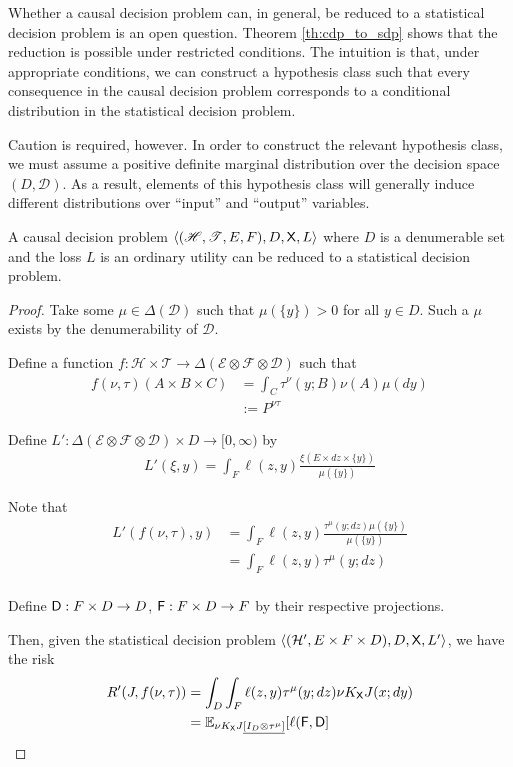 Whether a causal decision problem can, in general, be reduced to a statistical decision problem is an open question. Theorem \ref{th:cdp_to_sdp} shows that the reduction is possible under restricted conditions. The intuition is that, under appropriate conditions, we can construct a hypothesis class such that every consequence in the causal decision problem corresponds to a conditional distribution in the statistical decision problem.

Caution is required, however. In order to construct the relevant hypothesis class, we must assume a positive definite marginal distribution over the decision space $(D,\mathcal{D})$. As a result, elements of this hypothesis class will generally induce different distributions over ``input'' and ``output'' variables.

\begin{theorem}\label{th:cdp_to_sdp}
A causal decision problem $\langle (\mathscr{H},\mathscr{T},E,F),D,\mathsf{X},L\rangle$ where $D$ is a denumerable set and the loss $L$ is an ordinary utility can be reduced to a statistical decision problem.
\end{theorem}

\begin{proof}
Take some $\mu\in \Delta(\mathcal{D})$ such that $\mu(\{y\})>0$ for all $y\in D$. Such a $\mu$ exists by the denumerability of $\mathcal{D}$.

Define a function $f:\mathscr{H}\times\mathscr{T}\to \Delta(\mathcal{E}\otimes\mathcal{F}\otimes\mathcal{D})$ such that
\begin{align}
    f(\nu,\tau)(A\times B\times C)&=\int_C \tau^\nu(y;B) \nu(A)\mu(dy)\\
                                  &:=P^{\nu\tau}
\end{align}

Define $L':\Delta(\mathcal{E}\otimes\mathcal{F}\otimes\mathcal{D})\times D\to[0,\infty)$ by
\begin{align}
    L'(\xi,y) = \int_F \ell(z,y) \frac{\xi(E\times dz\times\{y\})}{\mu(\{y\})}
\end{align}

Note that
\begin{align}
    L'(f(\nu,\tau),y) &= \int_{F} \ell(z,y)  \frac{ \tau^{\mu}(y;dz)\mu(\{y\})}{\mu(\{y\})}\\
                      &= \int_F \ell(z,y) \tau^{\mu}(y;dz) \\
\end{align}

Define $\mathsf{D}:F\times D\to D$, $\mathsf{F}:F\times D\to F$ by their respective projections.

Then, given the statistical decision problem $\langle(\mathcal{H}',E\times F\times D),D,\mathsf{X},L'\rangle$, we have the risk
\begin{align}
    R'(J,f(\nu,\tau)) &= \int_D \int_F \ell(z,y) \tau^\mu(y;dz)  \nu K_{\mathsf{X}} J(x;dy) \\
                      &= \mathbb{E}_{\nu K_{\mathsf{X}} J\underline{[I_D\otimes \tau^\mu]}}[\ell(\mathsf{F},\mathsf{D}]
\end{align}
\end{proof}

